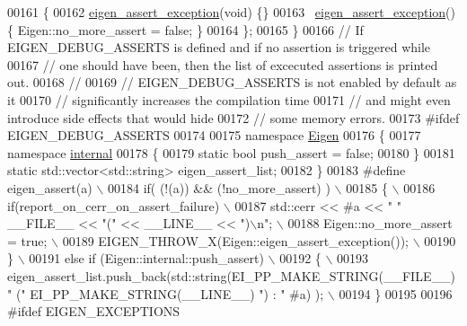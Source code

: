 \begin{DoxyCode}
00161     \{
00162       \hyperlink{struct_eigen_1_1eigen__assert__exception}{eigen\_assert\_exception}(\textcolor{keywordtype}{void}) \{\}
00163       ~\hyperlink{struct_eigen_1_1eigen__assert__exception}{eigen\_assert\_exception}() \{ Eigen::no\_more\_assert = \textcolor{keyword}{false}; \}
00164     \};
00165   \}
00166   \textcolor{comment}{// If EIGEN\_DEBUG\_ASSERTS is defined and if no assertion is triggered while}
00167   \textcolor{comment}{// one should have been, then the list of excecuted assertions is printed out.}
00168   \textcolor{comment}{//}
00169   \textcolor{comment}{// EIGEN\_DEBUG\_ASSERTS is not enabled by default as it}
00170   \textcolor{comment}{// significantly increases the compilation time}
00171   \textcolor{comment}{// and might even introduce side effects that would hide}
00172   \textcolor{comment}{// some memory errors.}
00173 \textcolor{preprocessor}{  #ifdef EIGEN\_DEBUG\_ASSERTS}
00174 
00175     \textcolor{keyword}{namespace }\hyperlink{namespace_eigen}{Eigen}
00176     \{
00177       \textcolor{keyword}{namespace }\hyperlink{namespaceinternal}{internal}
00178       \{
00179         \textcolor{keyword}{static} \textcolor{keywordtype}{bool} push\_assert = \textcolor{keyword}{false};
00180       \}
00181       \textcolor{keyword}{static} std::vector<std::string> eigen\_assert\_list;
00182     \}
00183 \textcolor{preprocessor}{    #define eigen\_assert(a)                       \(\backslash\)}
00184 \textcolor{preprocessor}{      if( (!(a)) && (!no\_more\_assert) )     \(\backslash\)}
00185 \textcolor{preprocessor}{      \{ \(\backslash\)}
00186 \textcolor{preprocessor}{        if(report\_on\_cerr\_on\_assert\_failure) \(\backslash\)}
00187 \textcolor{preprocessor}{          std::cerr <<  #a << " " \_\_FILE\_\_ << "(" << \_\_LINE\_\_ << ")\(\backslash\)n"; \(\backslash\)}
00188 \textcolor{preprocessor}{        Eigen::no\_more\_assert = true;       \(\backslash\)}
00189 \textcolor{preprocessor}{        EIGEN\_THROW\_X(Eigen::eigen\_assert\_exception()); \(\backslash\)}
00190 \textcolor{preprocessor}{      \}                                     \(\backslash\)}
00191 \textcolor{preprocessor}{      else if (Eigen::internal::push\_assert)       \(\backslash\)}
00192 \textcolor{preprocessor}{      \{                                     \(\backslash\)}
00193 \textcolor{preprocessor}{        eigen\_assert\_list.push\_back(std::string(EI\_PP\_MAKE\_STRING(\_\_FILE\_\_) " ("
       EI\_PP\_MAKE\_STRING(\_\_LINE\_\_) ") : " #a) ); \(\backslash\)}
00194 \textcolor{preprocessor}{      \}}
00195 
00196 \textcolor{preprocessor}{    #ifdef EIGEN\_EXCEPTIONS}

\end{DoxyCode}
